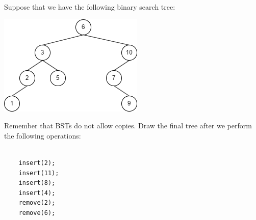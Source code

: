 \graphicspath{ {./bst-insertion-removal-images/} }

\question Suppose that we have the following binary search tree:

\includegraphics[scale=0.75]{topics/trees/binary-search-trees/medium/bst-insertion-removal-images/start.png}

Remember that BSTs do not allow copies. Draw the final tree after we perform the following operations:
\begin{lstlisting}
 
    insert(2);
    insert(11);
    insert(8);
    insert(4);
    remove(2);
    remove(6);
\end{lstlisting}

